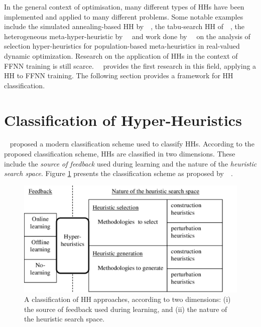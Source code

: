 In the general context of optimisation, many different types of \acp{HH} have been implemented and applied to many different problems. Some notable examples include the simulated annealing-based \acs{HH} by~\citeauthor{ref:dowsland:2007}~\cite{ref:dowsland:2007}, the tabu-search \acs{HH} of~\citeauthor{ref:burke:2010}~\cite{ref:burke:2010}, the heterogeneous meta-hyper-heuristic by~\citeauthor{ref:grobler:2012}~\cite{ref:grobler:2012} and work done by~\citeauthor{ref:vanderstockt:2018}~\cite{ref:vanderstockt:2018} on the analysis of selection hyper-heuristics for population-based meta-heuristics in real-valued dynamic optimization. Research on the application of \acp{HH} in the context of \acs{FFNN} training is still scarce.~\citeauthor{ref:nel:2021}~\cite{ref:nel:2021} provides the first research in this field, applying a \acs{HH} to \acs{FFNN} training. The following section provides a framework for \acs{HH} classification.


\section{Classification of Hyper-Heuristics}\label{sec:hh:classification}

\citeauthor{ref:burke:2010}~\cite{ref:burke:2010} proposed a modern classification scheme used to classify \acp{HH}. According to the proposed classification scheme, \acp{HH} are classified in two dimensions. These include the \textit{source of feedback} used during learning and the nature of the \textit{heuristic search space}. Figure \ref{fig:heuristics:hh:classification} presents the classification scheme as proposed by~\citeauthor{ref:burke:2010}~\cite{ref:burke:2010}.

\begin{figure}[htbp]
      \centering
      \includegraphics[width=\textwidth]{images/hh_classification.pdf}
      \caption{A classification of \acs{HH} approaches, according to two dimensions: (i) the source of feedback used during learning, and (ii) the nature of the heuristic search space.}
      \label{fig:heuristics:hh:classification}
\end{figure}

